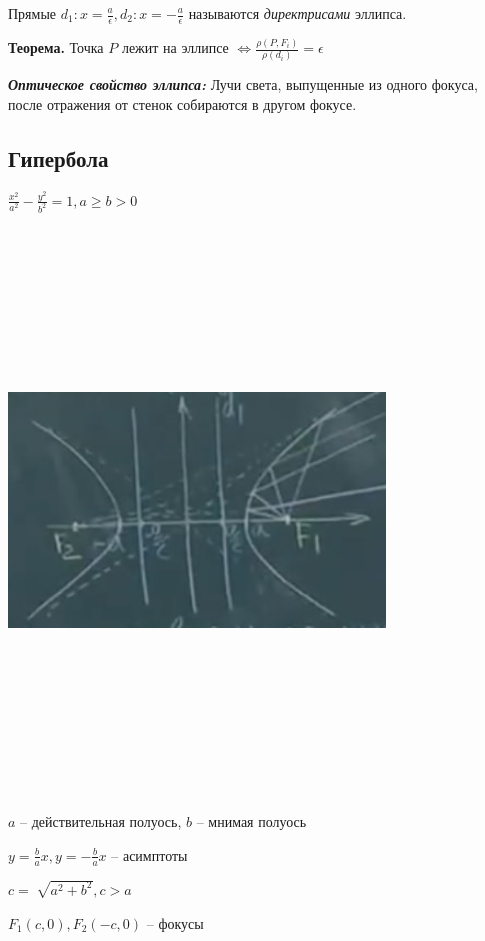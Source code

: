 \bigskip
Прямые $d_1: x = \frac{a}{\epsilon}, d_2: x = -\frac{a}{\epsilon}$ называются \textit{директрисами} эллипса.

\bigskip
\textbf{Теорема.} Точка $P$ лежит на эллипсе $\Leftrightarrow \frac{\rho(P, F_i)}{\rho(d_i)} = \epsilon$

\bigskip
\textbf{\textit{Оптическое свойство эллипса:}} Лучи света, выпущенные из одного фокуса, после отражения от стенок собираются в другом фокусе.

\subsection{Гипербола}

$\frac{x^2}{a^2} - \frac{y^2}{b^2} = 1, a \geqslant b > 0$

\bigskip
\includegraphics[width=10cm,height=15cm,keepaspectratio]{example4.jpg}

\bigskip
$a$ -- действительная полуось, $b$ -- мнимая полуось

\bigskip
$y = \frac{b}{a}x, y = - \frac{b}{a}x$ -- асимптоты

$c = \sqrt[]{a^2 + b^2}, c > a$

$F_1(c, 0), F_2(-c, 0)$ -- фокусы

